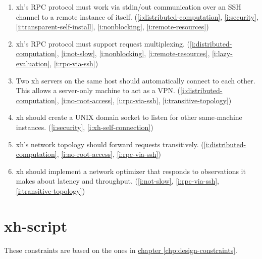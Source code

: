 \documentclass{report}
\newcommand{\Ref}[2]{\hyperref[#2]{#1 \ref*{#2}}}
\begin{document}
\begin{enumerate}
\item{}\label{i:rpc-via-ssh}
  xh's RPC protocol must work via stdin/out communication over an SSH
  channel to a remote instance of itself.
    (\ref{i:distributed-computation},
     \ref{i:security},
     \ref{i:transparent-self-install},
     \ref{i:nonblocking},
     \ref{i:remote-resources})
\item{}\label{i:rpc-multiplexing}
  xh's RPC protocol must support request multiplexing.
    (\ref{i:distributed-computation},
     \ref{i:not-slow},
     \ref{i:nonblocking},
     \ref{i:remote-resources},
     \ref{i:lazy-evaluation},
     \ref{i:rpc-via-ssh})
\item{}\label{i:xh-self-connection}
  Two xh servers on the same host should automatically connect to each
  other. This allows a server-only machine to act as a VPN.
    (\ref{i:distributed-computation},
     \ref{i:no-root-access},
     \ref{i:rpc-via-ssh},
     \ref{i:transitive-topology})
\item{}\label{i:domain-sockets}
  xh should create a UNIX domain socket to listen for other same-machine
  instances.
    (\ref{i:security},
     \ref{i:xh-self-connection})
\item{}\label{i:transitive-topology}
  xh's network topology should forward requests transitively.
    (\ref{i:distributed-computation},
     \ref{i:no-root-access},
     \ref{i:rpc-via-ssh})
\item{}\label{i:network-routing}
  xh should implement a network optimizer that responds to observations it
  makes about latency and throughput.
    (\ref{i:not-slow},
     \ref{i:rpc-via-ssh},
     \ref{i:transitive-topology})
\end{enumerate}

\chapter{xh-script}\label{chp:design-xh-script}
  These constraints are based on the ones in
  \Ref{chapter}{chp:design-constraints}.
\end{document}
